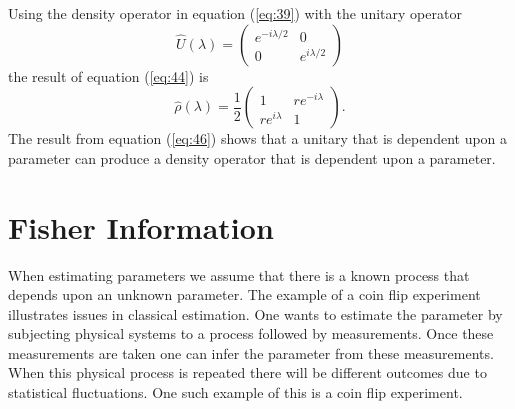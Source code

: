 \documentclass[twocolumn]{article}
\begin{document}
Using the density operator in equation (\ref{eq:39}) with the unitary operator
\begin{equation} \label{eq:45}
\hat{U}(\lambda)=
\begin{pmatrix}
e^{-i\lambda/2} & 0 \\
0 & e^{i\lambda/2}
\end{pmatrix}
\end{equation}
the result of equation (\ref{eq:44}) is
\begin{equation} \label{eq:46}
\hat{\rho}(\lambda)=\frac{1}{2}
\begin{pmatrix}
1 & re^{-i\lambda} \\
re^{i\lambda} & 1
\end{pmatrix}.
\end{equation}
The result from equation (\ref{eq:46}) shows that a unitary that is dependent upon a parameter can produce a density operator that is dependent upon a parameter.
\section*{Fisher Information}
When estimating parameters we assume that there is a known process that depends upon an
 unknown parameter. The example of a coin flip experiment illustrates issues in classical estimation. One wants to estimate the parameter by subjecting physical systems to a process followed by measurements. Once these measurements are taken one can infer the parameter from these measurements. When this physical process is repeated there will be different outcomes due to statistical fluctuations. One such example of this is a coin flip experiment.
\end{document}
